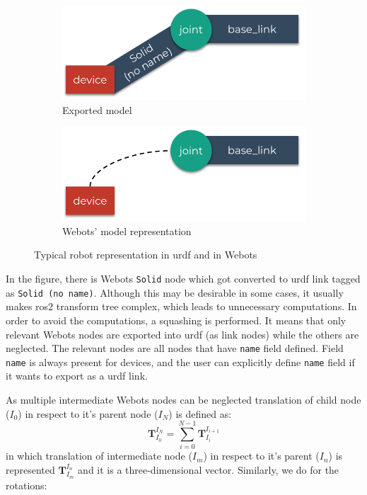 \begin{figure}[H]
\centering
\begin{subfigure}{\textwidth}
  \centering
  \includegraphics[width=.7\linewidth]{generalization/figures/squashing_transforms_actual.pdf}
  \caption{Exported model}
  \label{fig:generalization:squashing_transforms:actual}
\end{subfigure}
\begin{subfigure}{\textwidth}
  \centering
  \includegraphics[width=.7\linewidth]{generalization/figures/squashing_transforms_desired.pdf}
  \caption{Webots' model representation}
  \label{fig:generalization:squashing_transforms:desired}
\end{subfigure}
\caption{Typical robot representation in \ac{urdf} and in Webots}
\label{fig:generalization:squashing_transforms}
\end{figure}

In the figure, there is Webots \texttt{Solid} node which got converted to \ac{urdf} link tagged as \texttt{Solid (no name)}. Although this may be desirable in some cases, it usually makes \ac{ros2} transform tree complex, which leads to unnecessary computations. In order to avoid the computations, a squashing is performed. It means that only relevant Webots nodes are exported into \ac{urdf} (as link nodes) while the others are neglected. The relevant nodes are all nodes that have \texttt{name} field defined. Field \texttt{name} is always present for devices, and the user can explicitly define \texttt{name} field if it wants to export as a \ac{urdf} link.

As multiple intermediate Webots nodes can be neglected translation of child node ($I_0$) in respect to it's parent node ($I_N$) is defined as:
\begin{equation}
    \bm{T}_{I_0}^{I_N} = \sum_{i=0}^{N-1} \bm{T}_{I_i}^{I_{i+1}}
\end{equation}
in which translation of intermediate node ($I_m$) in respect to it's parent ($I_n$) is represented $ \bm{T}_{I_m}^{I_n} $ and it is a three-dimensional vector. Similarly, we do for the rotations:

